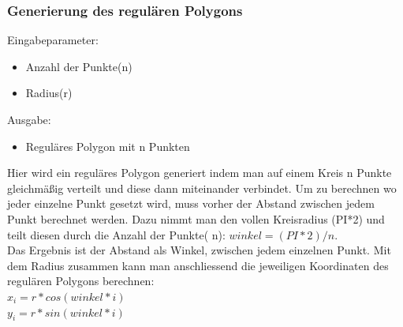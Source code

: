   \subsubsection{Generierung des regulären Polygons}
    Eingabeparameter: 
    \begin{itemize}
      \item Anzahl der Punkte(n)
      \item Radius(r)
    \end{itemize}
    Ausgabe:
    \begin{itemize} 
      \item Reguläres Polygon mit n Punkten
    \end{itemize}
    Hier wird ein reguläres Polygon generiert indem man auf einem Kreis n 
    Punkte gleichmäßig verteilt und diese dann miteinander verbindet. Um 
    zu berechnen wo jeder einzelne Punkt gesetzt wird, muss vorher der 
    Abstand zwischen jedem Punkt berechnet werden. Dazu nimmt man den 
    vollen Kreisradius (PI*2) und teilt diesen durch die Anzahl der Punkte(
    n): $winkel = (PI * 2) / n$.\\ 
    Das Ergebnis ist der Abstand als Winkel, zwischen jedem einzelnen 
    Punkt.
    Mit dem Radius zusammen kann man anschliessend die jeweiligen Koordinaten 
    des regulären Polygons berechnen:\\
    $x_i = r * cos(winkel * i)$\\
    $y_i = r * sin(winkel * i)$

